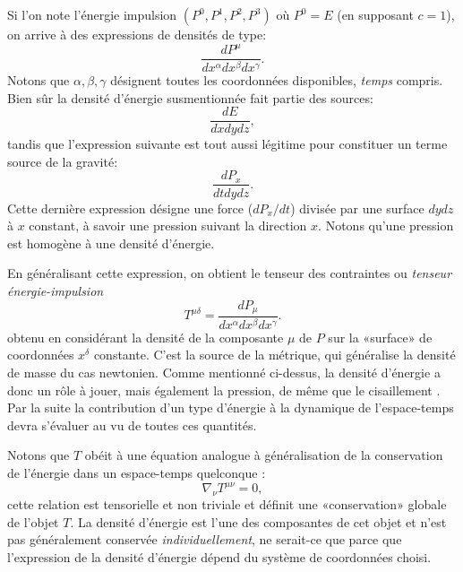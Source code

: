 Si l’on note l'énergie impulsion $(P^0,P^1,P^2,P^3)$ où $P^0=E$ (en supposant $c=1$), on arrive à des expressions de densités de type:
\begin{equation}
\frac{dP^\mu}{dx^\alpha dx^\beta dx^\gamma}.
\end{equation}
Notons que $\alpha,\beta,\gamma$ désignent toutes les coordonnées disponibles, \textit{temps} compris. Bien sûr la densité d'énergie susmentionnée fait partie des sources:
\begin{equation}
\frac{dE}{dx dy dz},
\end{equation}
tandis que l'expression suivante est tout aussi légitime pour constituer un terme source de la gravité:
\begin{equation}
\frac{dP_x}{dtdydz}.
\end{equation}
Cette dernière expression désigne une force ($dP_x/dt$) divisée par une surface $dydz$ à $x$ constant, à savoir une pression suivant la direction $x$. Notons qu'une pression est homogène à une densité d'énergie.

En généralisant cette expression, on obtient le tenseur des contraintes ou \textit{tenseur énergie-impulsion}
\begin{equation}
T^{\mu\delta} = \frac{dP_\mu}{dx^\alpha dx^\beta dx^\gamma}.
\end{equation}
obtenu en considérant la densité de la composante $\mu$ de $P$ sur la «surface» de coordonnées $x^\delta$ constante. C'est la source de la métrique, qui généralise la densité de masse du cas newtonien.  Comme mentionné ci-dessus, la densité d'énergie a donc un rôle à jouer, mais également la pression, de même que le cisaillement . Par la suite la contribution d'un type d'énergie à la dynamique de l'espace-temps devra s'évaluer au vu de toutes ces quantités. 

Notons que $T$ obéit à une équation analogue à généralisation de la conservation de l'énergie dans un espace-temps quelconque : 
 \begin{equation}
 \nabla_\nu T^{\mu\nu}=0,
 \label{e:divT}
 \end{equation}
 cette relation est tensorielle et non triviale et définit une «conservation» globale de l'objet $T$. La densité d'énergie est l'une des composantes de cet objet et n'est pas généralement conservée \textit{individuellement}, ne serait-ce que parce que l'expression de la densité d'énergie dépend du système de coordonnées choisi.

